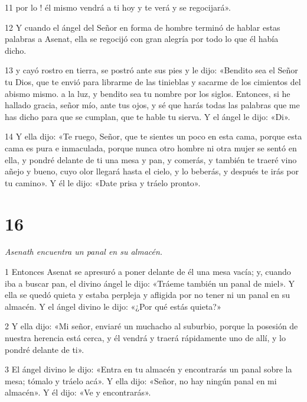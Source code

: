 \par 11 por lo ! él mismo vendrá a ti hoy y te verá y se regocijará».

\par 12 Y cuando el ángel del Señor en forma de hombre terminó de hablar estas palabras a Asenat, ella se regocijó con gran alegría por todo lo que él había dicho.

\par 13 y cayó rostro en tierra, se postró ante sus pies y le dijo: «Bendito sea el Señor tu Dios, que te envió para librarme de las tinieblas y sacarme de los cimientos del abismo mismo. a la luz, y bendito sea tu nombre por los siglos. Entonces, si he hallado gracia, señor mío, ante tus ojos, y sé que harás todas las palabras que me has dicho para que se cumplan, que te hable tu sierva. Y el ángel le dijo: «Di».

\par 14 Y ella dijo: «Te ruego, Señor, que te sientes un poco en esta cama, porque esta cama es pura e inmaculada, porque nunca otro hombre ni otra mujer se sentó en ella, y pondré delante de ti una mesa y pan, y comerás, y también te traeré vino añejo y bueno, cuyo olor llegará hasta el cielo, y lo beberás, y después te irás por tu camino». Y él le dijo: «Date prisa y tráelo pronto».

\chapter{16}

\par \textit{Asenath encuentra un panal en su almacén.}

\par 1 Entonces Asenat se apresuró a poner delante de él una mesa vacía; y, cuando iba a buscar pan, el divino ángel le dijo: «Tráeme también un panal de miel». Y ella se quedó quieta y estaba perpleja y afligida por no tener ni un panal en su almacén. Y el ángel divino le dijo: «¿Por qué estás quieta?»

\par 2 Y ella dijo: «Mi señor, enviaré un muchacho al suburbio, porque la posesión de nuestra herencia está cerca, y él vendrá y traerá rápidamente uno de allí, y lo pondré delante de ti».

\par 3 El ángel divino le dijo: «Entra en tu almacén y encontrarás un panal sobre la mesa; tómalo y tráelo acá». Y ella dijo: «Señor, no hay ningún panal en mi almacén». Y él dijo: «Ve y encontrarás».

